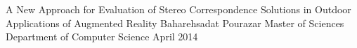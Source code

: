 \documentclass[dvips,letterpaper,12pt]{report}
\begin{document}

\thesistitle
	{A New Approach for Evaluation of Stereo Correspondence Solutions in Outdoor Applications of Augmented Reality}
	{Baharehsadat Pourazar}
	{Master of Sciences}
	{Department of Computer Science}
	{April 2014}

%
%












 
\end{document}
